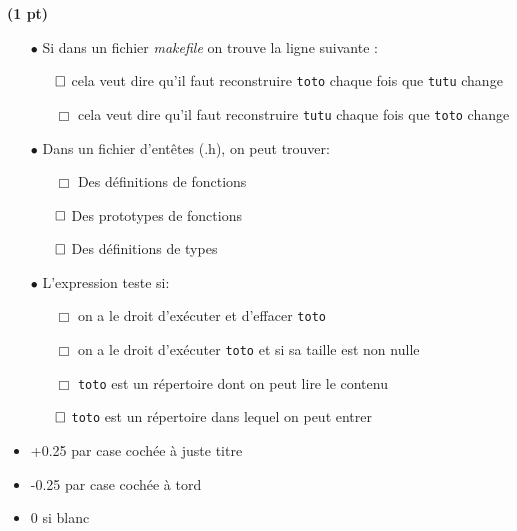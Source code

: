 \documentclass[10pt]{article}
\newcommand{\BoxRep}{\ifcorrection{\boxtimes}{\Box}}
\begin{document}
\begin{Exercice}
\Question \textbf{(1 pt)}
\begin{itemize}
\item[$\bullet$] Si dans un fichier \textit{makefile} on trouve la ligne suivante :
  \begin{itemize}
  \item[$\BoxRep$] cela veut dire qu'il faut reconstruire \texttt{toto} chaque
    fois que \texttt{tutu} change
  \item[$\Box$] cela veut dire qu'il faut reconstruire \texttt{tutu} chaque
    fois que \texttt{toto} change
  \end{itemize}
\item[$\bullet$] Dans un fichier d'entêtes (.h), on peut trouver:
  \begin{itemize}
  \item[$\Box$] Des définitions de fonctions
  \item[$\BoxRep$] Des prototypes de fonctions
  \item[$\BoxRep$] Des définitions de types
  \end{itemize}
\item[$\bullet$] L'expression  teste si:
  \begin{itemize}
  \item[$\Box$] on a le droit d'exécuter et d'effacer \texttt{toto}
  \item[$\Box$] on a le droit d'exécuter \texttt{toto} et si sa taille est non nulle
  \item[$\Box$] \texttt{toto} est un répertoire dont on peut lire le contenu
  \item[$\BoxRep$] \texttt{toto} est un répertoire dans lequel on peut entrer
  \end{itemize}
\end{itemize}
\begin{Reponse}
  \begin{itemize}
  \item +0.25 par case cochée à juste titre
  \item -0.25 par case cochée à tord
  \item 0 si blanc
  \end{itemize}
\end{Reponse}

\end{Exercice}

      

\end{document}
